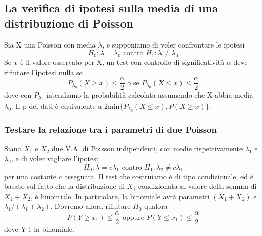 \documentclass[11pt]{article}
\begin{document}
\subsection{La verifica di ipotesi sulla media di una distribuzione di Poisson}
Sia X una Poisson con media $\lambda$, e supponiamo di voler confrontare le ipotesi
\begin{displaymath}
    H_0:\lambda=\lambda_0\mbox{ contro }H_1:\lambda\neq\lambda_0
\end{displaymath}
Se $x$ è il valore osservato per X, un test con controllo di significatività $\alpha$ deve rifiutare l'ipotesi nulla se 
\begin{displaymath}
    P_{\lambda_0}(X\ge x)\le \frac{\alpha}{2}\mbox{ o se }P_{\lambda_0}(X\le x)\le \frac{\alpha}{2}
\end{displaymath}
dove con $P_{\lambda_0}$ intendiamo la probabilità calcolata assumendo che X abbia media $\lambda_0$. Il p-dei-dati è equivalente a $2$min$\{P_{\lambda_0}(X \le x), P(X\ge x)\}$.
\subsubsection{Testare la relazione tra i parametri di due Poisson}
Siano $X_1$ e $X_2$ due V.A. di Poisson indipendenti, con medie rispettivamente $\lambda_1$ e $\lambda_2$, e di voler vagliare l'ipotesi
\begin{displaymath}
    H_0:\lambda=c\lambda_1\mbox{ contro }H_1:\lambda_2 \neq c\lambda_1
\end{displaymath}
per una costante $c$ assegnata. Il test che costruiamo è di tipo condizionale, ed è basato sul fatto che la distribuzione di $X_1$ condizionata al valore della somma di $X_1+X_2$, è binomiale. In particolare, la binomiale avrà parametri $(X_1+X_2)$ e $\lambda_1/(\lambda_1+\lambda_2)$. Dovremo allora rifiutare $H_0$ qualora
\begin{displaymath}
    P(Y\ge x_1)\le\frac{\alpha}{2}\mbox{ oppure }P(Y\le x_1)\le \frac{\alpha}{2}
\end{displaymath}
dove Y è la binomiale.
\end{document}
